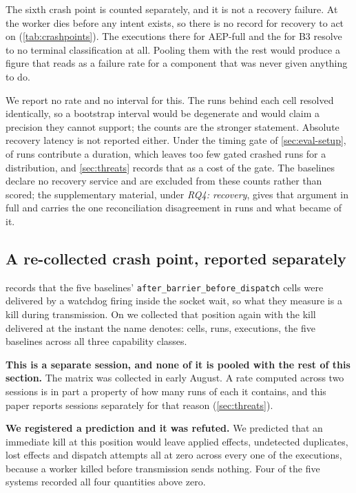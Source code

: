 The sixth crash point is counted separately, and it is not a recovery
failure. At  the worker dies before any intent
exists, so there is no record for recovery to act on
(\cref{tab:crashpoints}). The \RecoveryAepNoRecord{} executions there for
AEP-full and the \RecoveryBthreeNoRecord{} for B3 resolve to no terminal
classification at all. Pooling them with
the rest would produce a figure that reads as a failure rate for a component
that was never given anything to do.

We report no rate and no interval for this. The runs behind each cell
resolved identically, so a bootstrap interval would be degenerate and would
claim a precision they cannot support; the counts are the stronger statement.
Absolute recovery latency is not reported either. Under the timing gate of
\cref{sec:eval-setup}, \RunsWithUsableTiming{} of \RunsCollected{} runs
contribute a duration, which leaves too few gated crashed runs for a
distribution, and \cref{sec:threats} records that as a cost of the gate. The
baselines declare no recovery service and are excluded from these counts
rather than scored; the supplementary material, under \emph{RQ4: recovery},
gives that argument in full and carries the one reconciliation disagreement
in \RunsCollected{} runs and what became of it.


\subsection{A re-collected crash point, reported separately}
\label{sec:eval-abd}

 records that the five baselines'
\texttt{after\_barrier\_before\_dispatch} cells were delivered by a watchdog
firing inside the socket wait, so what they measure is a kill during
transmission. On \AbdDate{} we collected that position again with the kill
delivered at the instant the name denotes: \AbdCells{} cells, \AbdRuns{} runs,
\AbdExecutions{} executions, the five baselines across all three capability
classes.

\textbf{This is a separate session, and none of it is pooled with the rest of
this section.} The matrix was collected in early August. A rate computed
across two sessions is in part a property of how many runs of each it
contains, and this paper reports sessions separately for that reason
(\cref{sec:threats}).

\textbf{We registered a prediction and it was refuted.} We predicted that an
immediate kill at this position would leave applied effects, undetected
duplicates, lost effects and dispatch attempts all at zero across every one of
the \AbdExecutions{} executions, because a worker killed before transmission
sends nothing. Four of the five systems recorded all four quantities above
zero.


